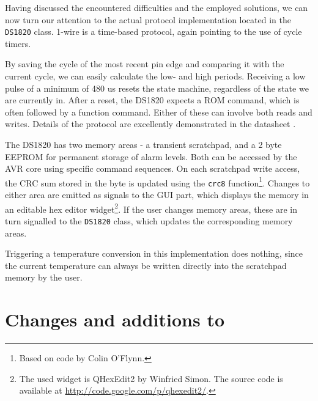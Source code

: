 Having discussed the encountered difficulties and the employed solutions, we
can now turn our attention to the actual protocol implementation located in the
\lstinline|DS1820| class. 1-wire is a time-based protocol, again pointing to the
use of cycle timers.

By saving the cycle of the most recent pin edge and comparing
it with the current cycle, we can easily calculate the low- and high periods.
Receiving a low pulse of a minimum of 480 \ac{us} resets the state machine,
regardless of the state we are currently in. After a reset, the DS1820
expects a ROM command, which is often followed by a function command. Either of
these can involve both reads and writes. Details of the protocol are excellently
demonstrated in the datasheet \cite{maxim02}.

The DS1820 has two memory areas - a transient scratchpad, and a 2 byte \ac{EEPROM}
for permanent storage of alarm levels. Both can be accessed by the \ac{AVR} core
using specific command sequences. On each scratchpad write access, the \ac{CRC}
sum stored in the  byte is updated using the \lstinline|crc8| function\footnote{
%
Based on code by Colin O'Flynn.
%
}. Changes to either area are emitted as signals to the \ac{GUI} part, which
displays the memory in an editable hex editor widget\footnote{
%
The used widget is QHexEdit2 by Winfried Simon. The source code is available
at \url{http://code.google.com/p/qhexedit2/}.
%
}. If the user changes memory areas, these are in turn signalled to the
\lstinline|DS1820| class, which updates the corresponding memory areas.

Triggering a temperature conversion in this implementation does nothing, since the
current temperature can always be written directly into the scratchpad memory by the user.

\section{Changes and additions to \simavr}
